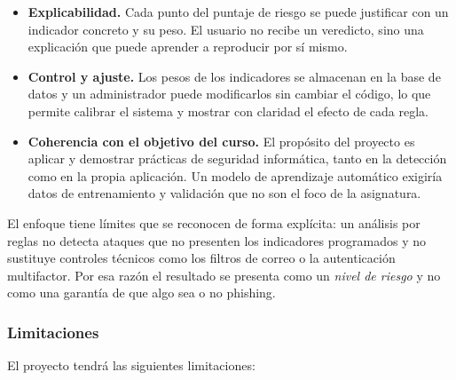 \documentclass[journal,onecolumn,12pt,draftclsnofoot]{IEEEtran}
\begin{document}
\begin{itemize}
  \item \textbf{Explicabilidad.} Cada punto del puntaje de riesgo se puede justificar con un indicador concreto y su peso. El usuario no recibe un veredicto, sino una explicación que puede aprender a reproducir por sí mismo.
  \item \textbf{Control y ajuste.} Los pesos de los indicadores se almacenan en la base de datos y un administrador puede modificarlos sin cambiar el código, lo que permite calibrar el sistema y mostrar con claridad el efecto de cada regla.
  \item \textbf{Coherencia con el objetivo del curso.} El propósito del proyecto es aplicar y demostrar prácticas de seguridad informática, tanto en la detección como en la propia aplicación. Un modelo de aprendizaje automático exigiría datos de entrenamiento y validación que no son el foco de la asignatura.
\end{itemize}

El enfoque tiene límites que se reconocen de forma explícita: un análisis por reglas no detecta ataques que no presenten los indicadores programados y no sustituye controles técnicos como los filtros de correo o la autenticación multifactor. Por esa razón el resultado se presenta como un \emph{nivel de riesgo} y no como una garantía de que algo sea o no phishing.

\subsubsection{Limitaciones}

El proyecto tendrá las siguientes limitaciones:
\end{document}
